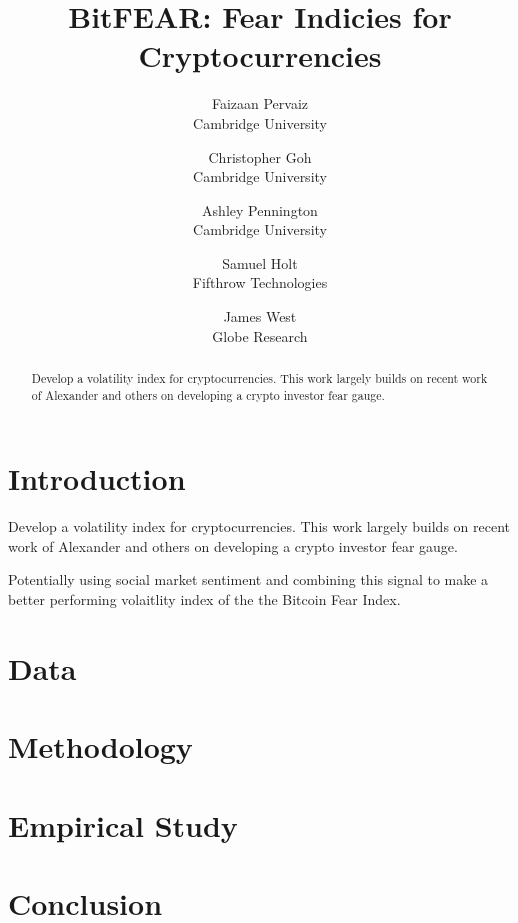 \documentclass[11pt,a4paper,english]{article}
\title{BitFEAR: Fear Indicies for Cryptocurrencies}
\author{%
    Faizaan Pervaiz \\
    \small Cambridge University\\
    \and
    Christopher Goh \\
    \small Cambridge University\\
    \and
    Ashley Pennington \\
    \small Cambridge University\\
    \and
    Samuel Holt \\
    \small Fifthrow Technologies\\
    \and
    James West\\
    \small Globe Research\\
}
\begin{document}
    \maketitle

    \begin{abstract}
    Develop a volatility index for cryptocurrencies.
    This work largely builds on recent work of Alexander and others on developing a crypto
    investor fear gauge.
    \end{abstract}
    \newpage

    \tableofcontents\newpage
    \section{Introduction}
    Develop a volatility index for cryptocurrencies.
    This work largely builds on recent work of Alexander and others on developing a crypto
    investor fear gauge.

    Potentially using social market sentiment and combining this signal to make a better performing volaitlity index of the the Bitcoin Fear Index.
    \section{Data}
    \section{Methodology}
    \section{Empirical Study}
    \section{Conclusion}
\end{document}
